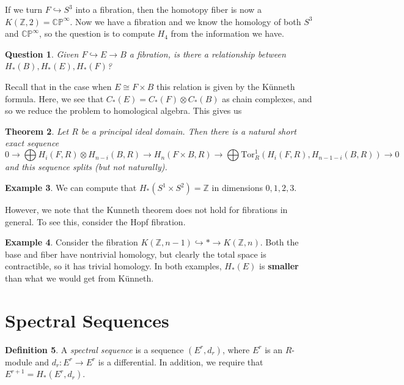\documentclass[leqno, openany]{memoir}
\newtheorem{thm}{Theorem}[section]
\newtheorem{quest}[thm]{Question}
\theoremstyle{definition}
\newtheorem{defn}[thm]{Definition}
\newtheorem{exm}[thm]{Example}
\theoremstyle{remark}
\theoremstyle{plain}
\theoremstyle{definition}
\theoremstyle{remark}
\newcommand{\C}{\mathbb{C}}
\newcommand{\Z}{\mathbb{Z}}
\renewcommand{\P}{\mathbb{P}}
\newcommand{\mr}[1]{\mathrm{#1}}
\begin{document}
If we turn $F \hookrightarrow S^3$ into a fibration, then the homotopy fiber is now a $K(\Z, 2) = \C\P^{\infty}$. Now we have a fibration and we know the homology of both $S^3$ and $\C\P^{\infty}$, so the question is to compute $H_4$ from the information we have.

\begin{quest}
    Given $F \hookrightarrow E \to B$ a fibration, is there a relationship between $H_*(B), H_*(E), H_*(F)$?
\end{quest}

Recall that in the case when $E \cong F \times B$ this relation is given by the K\"unneth formula. Here, we see that $C_*(E) = C_*(F) \otimes C_*(B)$ as chain complexes, and so we reduce the problem to homological algebra. This gives us

\begin{thm}
    Let $R$ be a principal ideal domain. Then there is a natural short exact sequence
    \[ 0 \to \bigoplus H_i(F,R) \otimes H_{n-i}(B, R) \to H_n(F \times B, R) \to \bigoplus \mr{Tor}^1_R(H_i(F,R), H_{n-1-i}(B, R)) \to 0 \]
    and this sequence splits (but not naturally).
\end{thm}

\begin{exm}
    We can compute that $H_*(S^1 \times S^2) = \Z$ in dimensions $0,1,2,3$.
\end{exm}

However, we note that the Kunneth theorem does not hold for fibrations in general. To see this, consider the Hopf fibration.

\begin{exm}
    Consider the fibration $K(\Z, n-1) \hookrightarrow * \to K(\Z, n)$. Both the base and fiber have nontrivial homology, but clearly the total space is contractible, so it has trivial homology. In both examples, $H_*(E)$ is \textbf{smaller} than what we would get from K\"unneth. 
\end{exm}

\section{Spectral Sequences}%
\label{sec:spectral_sequences}

\begin{defn}
    A \textit{spectral sequence} is a sequence $(E^r, d_r)$, where $E^r$ is an $R$-module and $d_r \colon E^r \to E^r$ is a differential. In addition, we require that $E^{r+1} = H_*(E^r, d_r)$. 
\end{defn}
\end{document}
